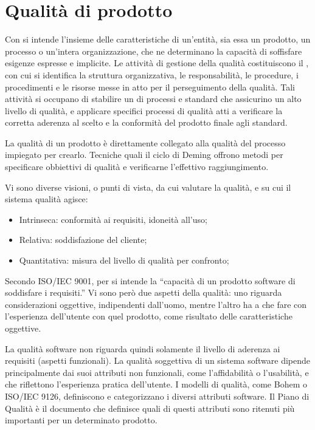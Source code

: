 \section{Qualità di prodotto}

Con  si intende l'insieme delle caratteristiche di un'entità,
sia essa un prodotto, un processo o un'intera organizzazione, che ne determinano
la capacità di soffisfare esigenze espresse e implicite. Le attività di gestione
della qualità costituiscono il , con cui si identifica
la struttura organizzativa, le responsabilità, le procedure, i procedimenti e le
risorse messe in atto per il perseguimento della qualità. Tali attività  si
occupano di stabilire un  di processi e standard che
assicurino un alto livello di qualità, e applicare specifici processi di qualità
atti a verificare la corretta aderenza al  scelto e la
conformità del prodotto finale agli standard.

La qualità di un prodotto è direttamente collegato alla qualità del processo
impiegato per crearlo. Tecniche quali il ciclo di Deming offrono metodi per
specificare obbiettivi di qualità e verificarne l'effettivo raggiungimento.

Vi sono diverse visioni, o punti di vista, da cui valutare la qualità, e su cui
il sistema qualità agisce:

\begin{itemize}
  \item Intrinseca: conformità ai requisiti, idoneità all'uso;
  \item Relativa: soddisfazione del cliente;
  \item Quantitativa: misura del livello di qualità per confronto;
\end{itemize}

Secondo ISO/IEC 9001, per  si intende la ``capacità di
un prodotto software di soddisfare i requisiti.'' Vi sono però due aspetti della
qualità: uno riguarda considerazioni oggettive, indipendenti dall'uomo, mentre
l'altro ha a che fare con l'esperienza dell'utente con quel prodotto, come
risultato delle caratteristiche oggettive.

La qualità software non riguarda quindi solamente il livello di aderenza ai
requisiti (aspetti funzionali). La qualità soggettiva di un sistema software
dipende principalmente dai suoi attributi non funzionali, come l'affidabilità o
l'usabilità, e che riflettono l'esperienza pratica dell'utente. I modelli di
qualità, come Bohem o ISO/IEC 9126, definiscono e categorizzano i diversi
attributi software. Il Piano di Qualità è il documento che definisce quali di
questi attributi sono ritenuti più importanti per un determinato prodotto.

